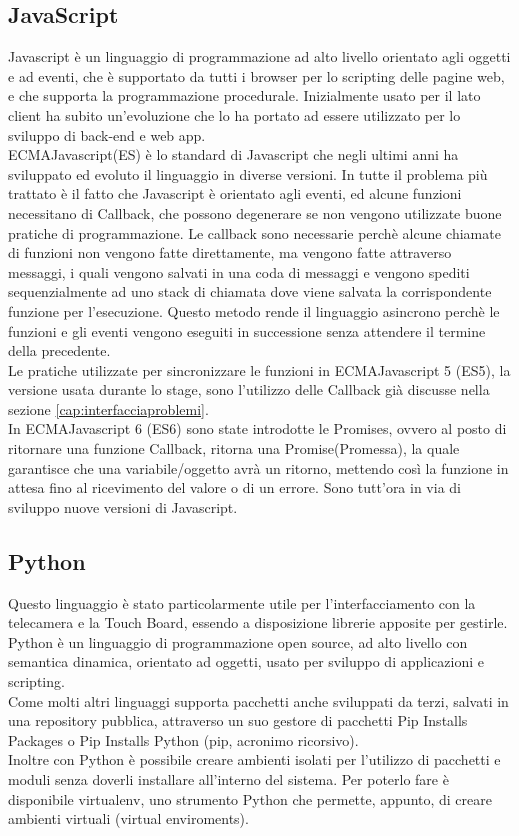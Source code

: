 \subsection{JavaScript}
Javascript \`e un linguaggio di programmazione ad alto livello orientato agli oggetti e ad eventi, che \`e supportato da tutti i browser
per lo scripting delle pagine web, e che supporta la programmazione procedurale.
Inizialmente usato per il lato client ha subito un'evoluzione che lo ha portato ad essere utilizzato per lo sviluppo di back-end e web app.
\\[2\baselineskip]
ECMAJavascript(ES) \`e lo standard di Javascript che negli ultimi anni ha sviluppato ed evoluto il linguaggio in diverse versioni.
In tutte il problema pi\`u trattato \`e il fatto che Javascript \`e orientato agli eventi,
ed alcune funzioni necessitano di Callback, che possono degenerare se non vengono
utilizzate buone pratiche di programmazione. Le callback sono necessarie perch\`e alcune chiamate di funzioni non vengono fatte direttamente, ma vengono
fatte attraverso messaggi, i quali vengono salvati in una coda di messaggi e vengono spediti sequenzialmente ad uno stack di chiamata dove
viene salvata la corrispondente funzione per l'esecuzione. Questo metodo rende il linguaggio asincrono perch\`e le funzioni e gli eventi
vengono eseguiti in successione senza attendere il termine della precedente.\\[1\baselineskip]
Le pratiche utilizzate per sincronizzare le funzioni in ECMAJavascript 5 (ES5), la versione usata durante lo
stage, sono l'utilizzo delle Callback gi\`a discusse nella sezione \ref{cap:interfacciaproblemi}.\\[1\baselineskip]
In ECMAJavascript 6 (ES6) sono state introdotte le Promises, ovvero al posto di ritornare una funzione Callback, ritorna una Promise(Promessa),
la quale garantisce che una variabile/oggetto avr\`a un ritorno, mettendo cos\`i la funzione in attesa fino al ricevimento del valore o di un errore.
Sono tutt'ora in via di sviluppo nuove versioni di Javascript.

\subsection{Python}\label{cap:python}
Questo linguaggio \`e stato particolarmente utile per l'interfacciamento con la telecamera e la Touch Board, essendo a disposizione librerie
apposite per gestirle.
Python \`e un linguaggio di programmazione open source, ad alto livello con semantica dinamica, orientato ad oggetti, usato
per sviluppo di applicazioni e scripting.\\[1\baselineskip]
Come molti altri linguaggi supporta pacchetti anche sviluppati da terzi, salvati in una repository pubblica,
attraverso un suo gestore di pacchetti Pip Installs Packages o Pip Installs Python (pip, acronimo ricorsivo).
\\[1\baselineskip]
Inoltre con Python \`e possibile creare ambienti isolati per l'utilizzo di pacchetti e moduli senza doverli installare all'interno del sistema.
Per poterlo fare \`e disponibile virtualenv, uno strumento Python che permette, appunto, di creare ambienti virtuali (virtual enviroments).
\\[2\baselineskip]

